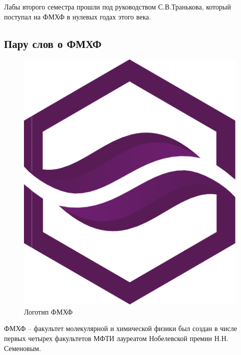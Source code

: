 \documentclass[a4paper,12pt]{article}
\begin{document}
Лабы второго семестра прошли под руководством С.В.Транькова, который поступал на ФМХФ в нулевых годах этого века.

\subsection{Пару слов о ФМХФ}

\begin{figure}
\includegraphics[width=\linewidth]{DCMP}
\caption{Логотип ФМХФ}
\end{figure}ФМХФ – факультет молекулярной и химической физики был создан в числе первых четырех факультетов МФТИ лауреатом Нобелевской премии Н.Н. Семеновым.
\end{document}
